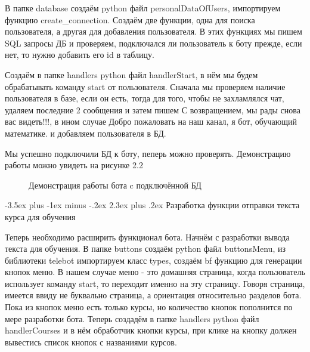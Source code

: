 \documentclass[12pt, oldlfont, amsfonts]{report}
\makeatletter
\renewcommand{\section}{\@startsection{section}{1}{0pt}%
                                {-3.5ex plus -1ex minus -.2ex}%
                                {2.3ex plus .2ex}%
{\centering\hyphenpenalty=10000\normalfont\Large\bfseries}}
\makeatother
\begin{document}
В папке database создаём python файл { personalDataOfUsers}, импортируем функцию { create\_connection}. Создаём две функции, одна для { поиска} пользователя, а другая для { добавления} пользователя. В этих функциях мы пишем { SQL запросы} ДБ и проверяем, подключался ли пользователь к боту прежде, если нет, то нужно добавить его { id} в таблицу.

Создаём в папке handlers python файл { handlerStart}, в нём мы будем обрабатывать команду { start} от пользователя. Сначала мы проверяем наличие пользователя в базе, если он есть, тогда для того, чтобы не захламлялся чат, удаляем последние 2 сообщения и затем пишем { С возвращением, мы рады снова вас видеть!!!}, в ином случае { Добро пожаловать на наш канал, я бот, обучающий математике.}  и добавляем пользователя в БД.

Мы успешно подключили БД к боту, пеперь можно проверять. Демонстрацию работы можно увидеть на рисунке 2.2


\begin{figure}[h!]
\caption{Демонстрация работы бота c подключённой БД}

\end{figure}


 
\section{Разработка функции отправки текста курса для обучения}

Теперь необходимо расширить функционал бота. Начнём с разработки вывода текста для обучения. В папке buttons создаём python файл buttonsMenu, из библиотеки telebot импортируем класс types, создаём {bf функцию для генерации кнопок меню}. В нашем случае { меню} - это { домашняя страница}, когда пользователь использует команду { start}, то переходит именно на эту страницу. Говоря страница, имеется ввиду не буквально страница, а ориентация относительно разделов бота. Пока из кнопок меню есть только { курсы}, но количество кнопок пополнится по мере разработки бота. Теперь создадём в папке { handlers} python файл { handlerCourses} и в нём обработчик кнопки { курсы}, при клике на кнопку должен вывестись список кнопок с названиями курсов.
\end{document}

